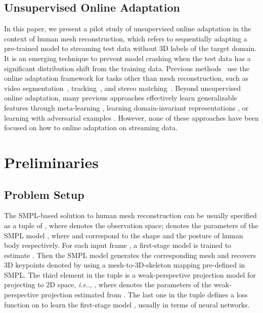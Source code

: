 \documentclass[10pt,journal,compsoc]{IEEEtran}
\makeatletter
\DeclareRobustCommand\onedot{\futurelet\@let@token\@onedot}
\def\@onedot{\ifx\@let@token.\else.\null\fi\xspace}
\def\ie{\emph{i.e}\onedot} \def\Ie{\emph{I.e}\onedot}
\makeatother
\begin{document}
\subsection{Unsupervised Online Adaptation}
In this paper, we present a pilot study of unsupervised online adaptation in the context of human mesh reconstruction, which refers to sequentially adapting a pre-trained model to streaming test data without 3D labels of the target domain.
It is an emerging technique to prevent model crashing when the test data has a significant distribution shift from the training data.
Previous methods~\cite{duchi2011adaptive,broderick2013streaming,bobu2018adapting,liu2020learning,park2018meta,voigtlaender2017online,tonioni2019real,broderick2013streaming,tonioni2019learning,zhang2020online,li2020self} use the online adaptation framework for tasks other than mesh reconstruction, such as video segmentation~\cite{voigtlaender2017online}, tracking~\cite{park2018meta}, and stereo matching~\cite{tonioni2019real,tonioni2019learning}. 
Beyond unsupervised online adaptation, many previous approaches effectively learn generalizable features through meta-learning \cite{finn2017model,fallah2020convergence,Huang_2021_CVPR}, learning domain-invariant representations \cite{khosla2012undoing,muandet2013domain,ghifary2015domain,li2017deeper,li2018domain,li2019episodic}, or learning with adversarial examples \cite{shankar2018generalizing,volpi2018generalizing,yao2021videodg}.
However, none of these approaches have been focused on how to online adaptation on streaming data. \section{Preliminaries}

\subsection{Problem Setup}
\label{sec:problem}

The SMPL-based solution to human mesh reconstruction can be usually specified as a tuple of , where  denotes the observation space;
 denotes the parameters of the SMPL model \cite{loper2015smpl}, where  and  correspond to the shape and the posture of human body respectively.
For each input frame , a first-stage model is trained to estimate . 
Then the SMPL model generates the corresponding mesh and recovers 3D keypoints denoted by  using a mesh-to-3D-skeleton mapping pre-defined in SMPL.
The third element in the tuple is a weak-perspective projection model for projecting  to 2D space, \ie, , where  denotes the parameters of the weak-perspective projection estimated from .
The last one in the tuple defines a loss function  on  to learn the first-stage model , usually in terms of neural networks.
\end{document}
